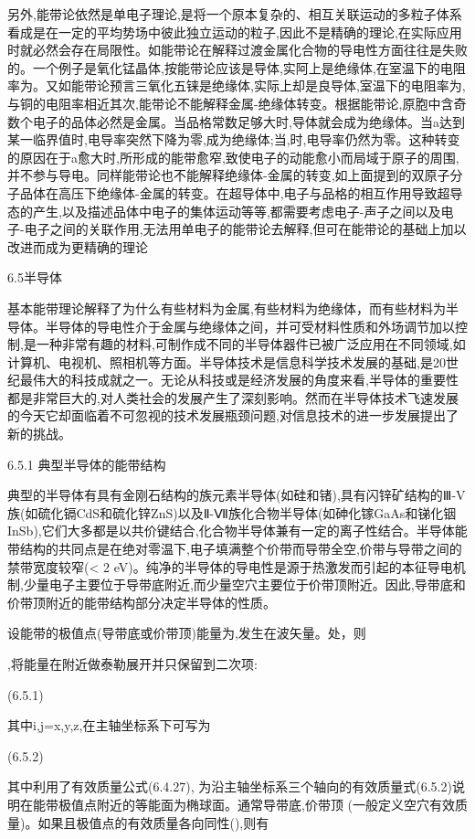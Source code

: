另外,能带论依然是单电子理论,是将一个原本复杂的、相互关联运动的多粒子体系看成是在一定的平均势场中彼此独立运动的粒子,因此不是精确的理论,在实际应用时就必然会存在局限性。如能带论在解释过渡金属化合物的导电性方面往往是失败的。一个例子是氧化锰晶体,按能带论应该是导体,实阿上是绝缘体,在室温下的电阻率为。又如能带论预言三氧化五铼是绝缘体,实际上却是良导体,室温下的电阻率为,与铜的电阻率相近其次,能带论不能解释金属-绝缘体转变。根据能带论,原胞中含奇数个电子的品体必然是金属。当品格常数足够大时,导体就会成为绝缘体。当a达到某一临界值时,电导率突然下降为零,成为绝缘体;当,时,电导率仍然为零。这种转变的原因在于a愈大时,所形成的能带愈窄,致使电子的动能愈小而局域于原子的周围,并不参与导电。同样能带论也不能解释绝缘体-金属的转变,如上面提到的双原子分子品体在高压下绝缘体-金属的转变。在超导体中,电子与品格的相互作用导致超导态的产生,以及描述品体中电子的集体运动等等,都需要考虑电子-声子之间以及电子-电子之间的关联作用,无法用单电子的能带论去解释,但可在能带论的基础上加以改进而成为更精确的理论



6.5半导体

基本能带理论解释了为什么有些材料为金属,有些材料为绝缘体，而有些材料为半导体。半导体的导电性介于金属与绝缘体之间，并可受材料性质和外场调节加以控制,是一种非常有趣的材料,可制作成不同的半导体器件已被广泛应用在不同领域,如计算机、电视机、照相机等方面。半导体技术是信息科学技术发展的基础,是20世纪最伟大的科技成就之一。无论从科技或是经济发展的角度来看,半导体的重要性都是非常巨大的,对人类社会的发展产生了深刻影响。然而在半导体技术飞速发展的今天它却面临着不可忽视的技术发展瓶颈问题,对信息技术的进一步发展提出了新的挑战。

6.5.1 典型半导体的能带结构

典型的半导体有具有金刚石结构的族元素半导体(如硅和锗),具有闪锌矿结构的Ⅲ-V族(如硫化镉CdS和硫化锌ZnS)以及Ⅱ-Ⅶ族化合物半导体(如砷化镓GaAs和锑化铟InSb),它们大多都是以共价键结合,化合物半导体兼有一定的离子性结合。半导体能带结构的共同点是在绝对零温下,电子填满整个价带而导带全空,价带与导带之间的禁带宽度较窄(< 2 eV)。纯净的半导体的导电性是源于热激发而引起的本征导电机制,少量电子主要位于导带底附近,而少量空穴主要位于价带顶附近。因此,导带底和价带顶附近的能带结构部分决定半导体的性质。

设能带的极值点(导带底或价带顶)能量为,发生在波矢量。处，则

,将能量在附近做泰勒展开并只保留到二次项:

	 (6.5.1)

其中i,j=x,y,z,在主轴坐标系下可写为

 	(6.5.2)

其中利用了有效质量公式(6.4.27), 为沿主轴坐标系三个轴向的有效质量式(6.5.2)说明在能带极值点附近的等能面为椭球面。通常导带底,价带顶 (一般定义空穴有效质量)。如果且极值点的有效质量各向同性(),则有

